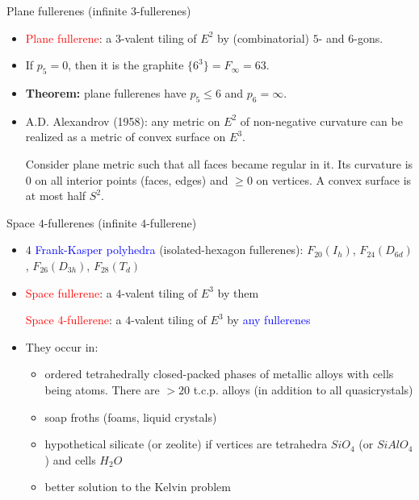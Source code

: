 \documentclass[%
pdf,
colorBG,
slideColor,
]{prosper}
\begin{document}
%
%







\begin{slide}{Plane fullerenes (infinite $3$-fullerenes)}
\begin{itemize}
\item \textcolor{red}{Plane fullerene}: a $3$-valent
tiling of $E^2$ by (combinatorial) $5$- and $6$-gons.
\item If $p_5=0$, then it is the graphite $\{6^3\}=F_{\infty}=63$.
\item {\bf Theorem:} plane fullerenes have
$p_5 \leq 6$ and $p_6=\infty$.
\item A.D. Alexandrov (1958): any metric on $E^2$ of
non-negative curvature can be realized as a metric of
convex surface on $E^3$.\par

Consider plane metric such that
all faces became regular in it. Its curvature is $0$ on all
interior points (faces, edges) and $\geq 0$ on vertices. A convex
surface is at most half $S^2$.
\end{itemize}

\end{slide}






\begin{slide}{Space $4$-fullerenes (infinite $4$-fullerene)}

\begin{itemize}
\item $4$ \textcolor{blue}{Frank-Kasper polyhedra}
(isolated-hexagon fullerenes): $F_{20}(I_h)$,
$F_{24}(D_{6d})$, $F_{26}(D_{3h})$, $F_{28}(T_d)$
\item \textcolor{red}{Space fullerene}: a $4$-valent tiling of
$E^3$ by them \par
\textcolor{red}{Space 4-fullerene}: a $4$-valent
tiling of $E^3$ by \textcolor{blue}{any fullerenes}
\item They occur in:
\begin{itemize}
\item ordered tetrahedrally closed-packed phases of metallic
alloys with cells being atoms. There are $>20$
t.c.p. alloys
(in addition to all quasicrystals)
\item soap froths (foams, liquid crystals)
\item hypothetical silicate (or zeolite) if vertices are
tetrahedra $SiO_4$ (or $SiAlO_4$) and cells $H_2O$
\item better solution to the Kelvin problem
\end{itemize}
\end{itemize}



\end{slide}
\end{document}

